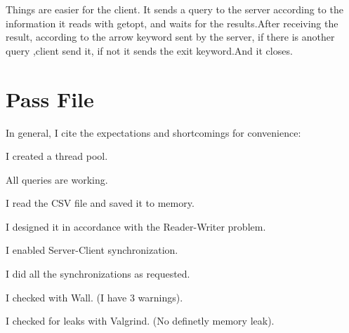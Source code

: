 \documentclass{article}
\begin{document}
Things are easier for the client. It sends a query to the server according to the information it reads with getopt, and waits for the results.After receiving the result, according to the arrow keyword sent by the server, if there is another query ,client send it, if not it sends the exit keyword.And it closes.


\section{Pass File}

In general, I cite the expectations and shortcomings for convenience:

I created a thread pool.

All queries are working.

I read the CSV file and saved it to memory.

I designed it in accordance with the Reader-Writer problem.

I enabled Server-Client synchronization.

I did all the synchronizations as requested.

I checked with Wall. (I have 3 warnings).

I checked for leaks with Valgrind. (No definetly memory leak).
\end{document}
